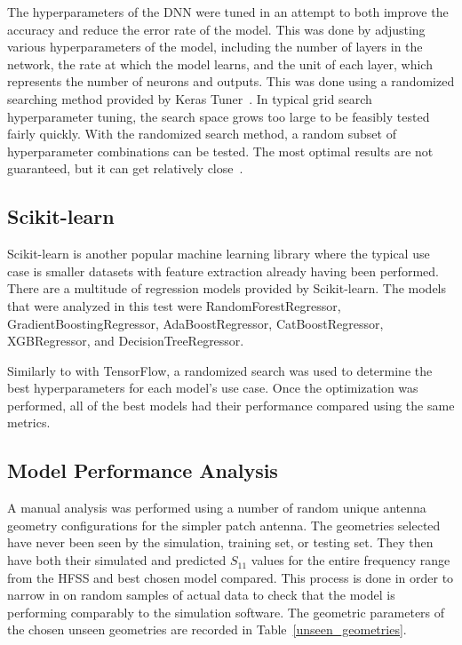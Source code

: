 \documentclass[lettersize,journal]{IEEEtran}
\begin{document}
The hyperparameters of the DNN were tuned in an attempt to both improve the accuracy and reduce the error rate of the model. This was done by adjusting various hyperparameters of the model, including the number of layers in the network, the rate at which the model learns, and the unit of each layer, which represents the number of neurons and outputs. This was done using a randomized searching method provided by Keras Tuner~\cite{omalley2019kerastuner}. In typical grid search hyperparameter tuning, the search space grows too large to be feasibly tested fairly quickly. With the randomized search method, a random subset of hyperparameter combinations can be tested. The most optimal results are not guaranteed, but it can get relatively close~\cite{meanti_efficient_2022}. 


\subsection{Scikit-learn}
Scikit-learn is another popular machine learning library where the typical use case is smaller datasets with feature extraction already having been performed. There are a multitude of regression models provided by Scikit-learn. The models that were analyzed in this test were RandomForestRegressor, GradientBoostingRegressor, AdaBoostRegressor, CatBoostRegressor, XGBRegressor, and DecisionTreeRegressor.

Similarly to with TensorFlow, a randomized search was used to determine the best hyperparameters for each model's use case. Once the optimization was performed, all of the best models had their performance compared using the same metrics. 

\subsection{Model Performance Analysis}
A manual analysis was performed using a number of random unique antenna geometry configurations for the simpler patch antenna. The geometries selected have never been seen by the simulation, training set, or testing set. They then have both their simulated and predicted $S_{11}$ values for the entire frequency range from the HFSS and best chosen model compared. This process is done in order to narrow in on random samples of actual data to check that the model is performing comparably to the simulation software. The geometric parameters of the chosen unseen geometries are recorded in Table~\ref{unseen_geometries}.
\end{document}
